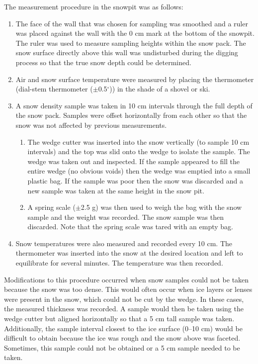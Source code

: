 \documentclass{sfuthesis}
\begin{document}
The measurement procedure in the snowpit was as follows:
\begin{enumerate}
\item The face of the wall that was chosen for sampling was smoothed and a ruler was placed against the wall with the 0 cm mark at the bottom of the snowpit. The ruler was used to measure sampling heights within the snow pack. The snow surface directly above this wall was undisturbed during the digging process so that the true snow depth could be determined. 
\item Air and snow surface temperature were measured by placing the thermometer (dial-stem thermometer ($\pm$0.5$^\circ$)) in the shade of a shovel or ski. 
\item A snow density sample was taken in 10 cm intervals through the full depth of the snow pack. Samples were offset horizontally from each other so that the snow was not affected by previous measurements. 
	\begin{enumerate}
	\item The wedge cutter was inserted into the snow vertically (to sample 10 cm intervals) and the top was slid onto the wedge to isolate the sample. The wedge was taken out and inspected. If the sample appeared to fill the entire wedge (no obvious voids) then the wedge was emptied into a small plastic bag. If the sample was poor then the snow was discarded and a new sample was taken at the same height in the snow pit. 
	\item A spring scale ($\pm$2.5 g) was then used to weigh the bag with the snow sample and the weight was recorded. The snow sample was then discarded. Note that the spring scale was tared with an empty bag.
	\end{enumerate}
\item Snow temperatures were also measured and recorded every 10 cm. The thermometer was inserted into the snow at the desired location and left to equilibrate for several minutes. The temperature was then recorded.
\end{enumerate}

Modifications to this procedure occurred when snow samples could not be taken because the snow was too dense. This would often occur when ice layers or lenses were present in the snow, which could not be cut by the wedge. In these cases, the measured thickness was recorded. A sample would then be taken using the wedge cutter but aligned horizontally so that a 5 cm tall sample was taken. Additionally, the sample interval closest to the ice surface (0--10 cm) would be difficult to obtain because the ice was rough and the snow above was faceted. Sometimes, this sample could not be obtained or a 5 cm sample needed to be taken. 
\end{document}
